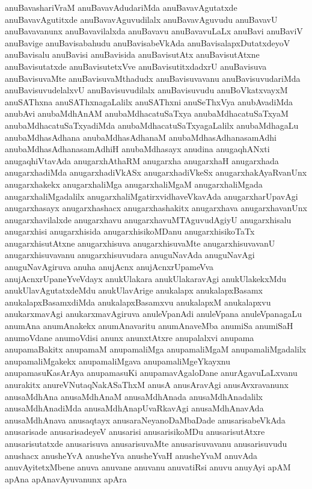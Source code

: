 {anuBavashariVraM
anuBavavAdudariMda
anuBavavAgutatxde
anuBavavAgutitxde
anuBavavAguvudilalx
anuBavavAguvudu
anuBavavU
anuBavavanunx
anuBavavilalxda
anuBavavu
anuBavavuLaLx
anuBavi
anuBaviV
anuBavige
anuBavisabahudu
anuBavisabeVkAda
anuBavisalapxDutatxdeyoV
anuBavisalu
anuBavisi
anuBavisida
anuBavisutAtx
anuBavisutAtxne
anuBavisutatxde
anuBavisutetxVve
anuBavisutitxdadxrU
anuBavisuva
anuBavisuvaMte
anuBavisuvaMthadudx
anuBavisuvavanu
anuBavisuvudariMda
anuBavisuvudelalxvU
anuBavisuvudilalx
anuBavisuvudu
anuBoVkatxvayxM
anuSAThxna
anuSAThxnagaLalilx
anuSAThxni
anuSeThxVya
anubAvadiMda
anubAvi
anubaMdhAnAM
anubaMdhacatuSaTxya
anubaMdhacatuSaTxyaM
anubaMdhacatuSaTxyadiMda
anubaMdhacatuSaTxyagaLalilx
anubaMdhagaLu
anubaMdhasAdhana
anubaMdhasAdhanaM
anubaMdhasAdhanasamAdhi
anubaMdhasAdhanasamAdhiH
anubaMdhasayx
anudina
anugaqhANxti
anugaqhiVtavAda
anugarxhAthaRM
anugarxha
anugarxhaH
anugarxhada
anugarxhadiMda
anugarxhadiVkASx
anugarxhadiVkeSx
anugarxhakAyaRvanUnx
anugarxhakekx
anugarxhaliMga
anugarxhaliMgaM
anugarxhaliMgada
anugarxhaliMgadalilx
anugarxhaliMgatirxvidhaveVkavAda
anugarxharUpavAgi
anugarxhasayx
anugarxhashacx
anugarxhashakitx
anugarxhava
anugarxhavanUnx
anugarxhavilalxde
anugarxhavu
anugarxhavuMTAguvudAgiyU
anugarxhisalu
anugarxhisi
anugarxhisida
anugarxhisikoMDanu
anugarxhisikoTaTx
anugarxhisutAtxne
anugarxhisuva
anugarxhisuvaMte
anugarxhisuvavanU
anugarxhisuvavanu
anugarxhisuvudara
anuguNavAda
anuguNavAgi
anuguNavAgiruva
anuha
anujAcnx
anujAcnxrUpameVva
anujAcnxrUpaneYveVdayx
anukUlakara
anukUlakaravAgi
anukUlakekxMdu
anukUlavAgutatxdeMdu
anukUlavArige
anukalapx
anukalapxBasamx
anukalapxBasamxdiMda
anukalapxBasamxvu
anukalapxM
anukalapxvu
anukarxmavAgi
anukarxmavAgiruva
anuleVpanAdi
anuleVpana
anuleVpanagaLu
anumAna
anumAnakekx
anumAnavaritu
anumAnaveMba
anumiSa
anumiSaH
anumoVdane
anumoVdisi
anunx
anunxtAtxre
anupalalxvi
anupama
anupamaBakitx
anupamaM
anupamaliMga
anupamaliMgaM
anupamaliMgadalilx
anupamaliMgakekx
anupamaliMgava
anupamaliMgeYkayxnu
anupamasuKasArAya
anupamasuKi
anupamavAgaloDane
anurAgavuLaLxvanu
anurakitx
anureVNutaqNakASaThxM
anusA
anusAravAgi
anusAvxravanunx
anusaMdhAna
anusaMdhAnaM
anusaMdhAnada
anusaMdhAnadalilx
anusaMdhAnadiMda
anusaMdhAnapUvaRkavAgi
anusaMdhAnavAda
anusaMdhAnava
anusaqtayx
anusaraNeyanoDaMbaDade
anusarisabeVkAda
anusarisade
anusarisadeyeV
anusarisi
anusarisikoMDu
anusarisutAtxre
anusarisutatxde
anusarisuva
anusarisuvaMte
anusarisuvavanu
anusarisuvudu
anushacx
anusheYvA
anusheYva
anusheYvaH
anusheYvaM
anuvAda
anuvAyitetxMbene
anuva
anuvane
anuvanu
anuvatiRsi
anuvu
anuyAyi
apAM
apAna
apAnavAyuvanunx
apAra
}
